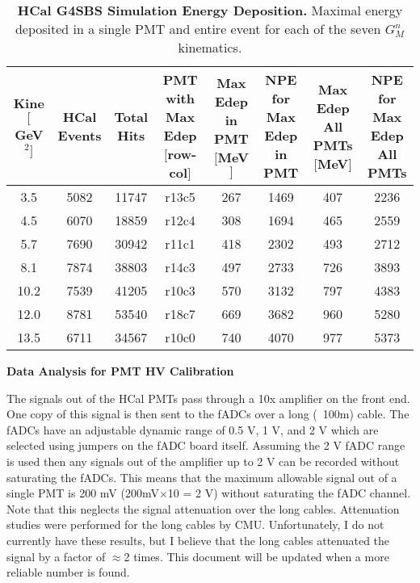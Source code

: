 \documentclass[10pt]{article}
\begin{document}
	\begin{table}[!ht]
	\centering
	\begin{tabular}{|c|ccccccc|}
	\hline
	\makecell{Kine\\$[$GeV$^2]$} & \makecell{HCal\\Events} & \makecell{Total\\Hits} & \makecell{PMT with\\Max Edep\\ $[$row-col$]$} & \makecell{Max Edep\\in PMT\\$[$MeV$]$} & \makecell{NPE for\\Max Edep\\in PMT} & \makecell{Max Edep\\All PMTs\\$[$MeV$]$} & \makecell{NPE for\\Max Edep\\All PMTs}\\
	\hline
	3.5 & 5082 & 11747 & r13c5 & 267 & 1469 & 407 & 2236 \\
    4.5 & 6070 & 18859 & r12c4 & 308 & 1694 & 465 & 2559 \\
    5.7 & 7690 & 30942 & r11c1 & 418 & 2302 & 493 & 2712 \\
    8.1 & 7874 & 38803 & r14c3 & 497 & 2733 & 726 & 3893 \\
    10.2 & 7539 & 41205 & r10c3 & 570 & 3132 & 797 & 4383 \\
    12.0 & 8781 & 53540 & r18c7 & 669 & 3682 & 960 & 5280 \\
    13.5 & 6711 & 34567 & r10c0 & 740 & 4070 & 977 & 5373 \\
	\hline
	\end{tabular}
	\caption{{\bf{HCal G4SBS Simulation Energy Deposition.}} Maximal energy deposited in a single PMT and entire event for each of the seven $G_M^n$ kinematics.} %
	\label{tab:edep}
	\end{table}
	
{\large \noindent \bf{Data Analysis for PMT HV Calibration}}
\vspace{3mm}
	
	The signals out of the HCal PMTs pass through a 10x amplifier on the front end. One copy of this signal is then sent to the fADCs over a long (~100m) cable. The fADCs have an adjustable dynamic range of 0.5 V, 1 V, and 2 V which are selected using jumpers on the fADC board itself. Assuming the 2 V fADC range is used then any signals out of the amplifier up to 2 V can be recorded without saturating the fADCs. This means that the maximum allowable signal out of a single PMT is 200 mV (200mV$\times$10 = 2 V) without saturating the fADC channel. Note that this neglects the signal attenuation over the long cables. Attenuation studies were performed for the long cables by CMU. Unfortunately, I do not currently have these results, but I believe that the long cables attenuated the signal by a factor of $\approx$2 times. This document will be updated when a more reliable number is found. 
	\vspace{3mm}
	
\end{document}
